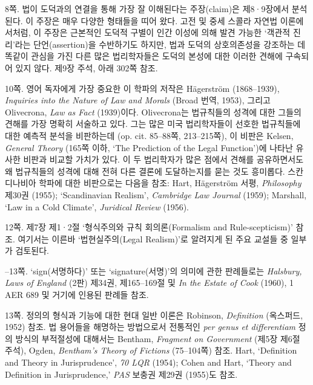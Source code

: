 {\noteentry 8쪽.  법이 도덕과의 연결을 통해 가장 잘
이해된다는 주장(claim)은 제8·9장에서 분석된다. 이 주장은 매우 다양한
형태들을 띠어 왔다. 고전 및 중세 스콜라 자연법 이론에서처럼, 이 주장은
근본적인 도덕적 구별이 인간 이성에 의해 발견 가능한 ‘객관적 진리’라는
단언(assertion)을 수반하기도 하지만, 법과 도덕의 상호의존성을 강조하는
데 똑같이 관심을 가진 다른 많은 법리학자들은 도덕의 본성에 대한 이러한
견해에 구속되어 있지 않다. 제9장 주석, 아래 302쪽 참조.

\noteentry 10쪽.  영어
독자에게 가장 중요한 이 학파의 저작은 Hägerström (1868--1939),
\emph{Inquiries into the Nature of Law and Morals} (Broad 번역, 1953),
그리고 Olivecrona, \emph{Law as Fact} (1939)이다. Olivecrona는
법규칙들의 성격에 대한 그들의 견해를 가장 명확히 서술하고 있다. 그는
많은 미국 법리학자들이 선호한 법규칙들에 대한 예측적 분석을 비판하는데
(op. cit. 85--88쪽, 213--215쪽), 이 비판은 Kelsen, \emph{General Theory}
(165쪽 이하, `The Prediction of the Legal Function')에 나타난 유사한
비판과 비교할 가치가 있다. 이 두 법리학자가 많은 점에서 견해를
공유하면서도 왜 법규칙들의 성격에 대해 전혀 다른 결론에 도달하는지를
묻는 것도 흥미롭다. 스칸디나비아 학파에 대한 비판으로는 다음을 참조:
Hart, Hägerström 서평, \emph{Philosophy} 제30권 (1955); `Scandinavian
Realism', \emph{Cambridge Law Journal} (1959); Marshall, `Law in a Cold
Climate', \emph{Juridical Review} (1956).

\noteentry 12쪽.  제7장
제1·2절 ‘형식주의와 규칙 회의론(Formalism and Rule-scepticism)’ 참조.
여기서는 이른바 ‘법현실주의(Legal Realism)’로 알려지게 된 주요 교설들 중
일부가 검토된다.

--13쪽.  ‘sign(서명하다)’ 또는
‘signature(서명)’의 의미에 관한 판례들로는 \emph{Halsbury, Laws of
England} (2판) 제34권, 제165--169절 및 \emph{In the Estate of Cook}
(1960), 1 AER 689 및 거기에 인용된 판례들 참조.

\noteentry 13쪽.  정의의 형식과 기능에 대한 현대 일반 이론은 Robinson,
\emph{Definition} (옥스퍼드, 1952) 참조. 법 용어들을 해명하는 방법으로서
전통적인 \emph{per genus et differentiam} 정의 방식의 부적절성에
대해서는 Bentham, \emph{Fragment on Government} (제5장 제6절 주석),
Ogden, \emph{Bentham's Theory of Fictions} (75--104쪽) 참조. Hart,
`Definition and Theory in Jurisprudence', \emph{70 LQR} (1954); Cohen
and Hart, `Theory and Definition in Jurisprudence,' \emph{PAS} 보충권
제29권 (1955)도 참조.

}
